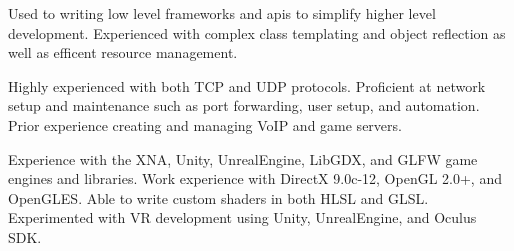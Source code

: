\vspace{-3mm}
\vspace{\acvSectionContentTopSkip}

\begin{cvparagraph}

Used to writing low level frameworks and apis to simplify higher level development. %
Experienced with complex class templating and object reflection as well as %
efficent resource management.
\end{cvparagraph}

\begin{cvparagraph}

Highly experienced with both TCP and UDP protocols. %
Proficient at network setup and maintenance such as port forwarding, user %
setup, and automation. Prior experience creating and managing VoIP and game servers.
\end{cvparagraph}


\begin{cvparagraph}

Experience with the XNA, Unity, UnrealEngine, LibGDX, and GLFW game engines and %
libraries. Work experience with DirectX 9.0c-12, OpenGL 2.0+, and OpenGLES. Able %
to write custom shaders in both HLSL and GLSL. Experimented with VR development %
using Unity, UnrealEngine, and Oculus SDK.
\end{cvparagraph}
